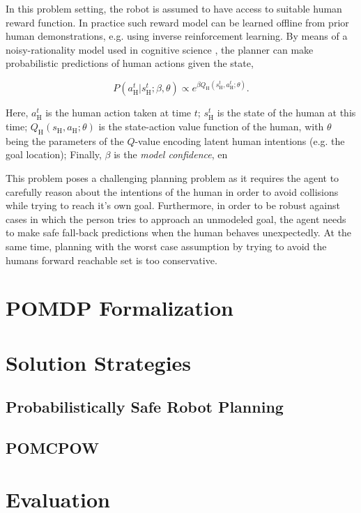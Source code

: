 In this problem setting, the robot is assumed to have access to suitable human
reward function. In practice such reward model can be learned offline from
prior human demonstrations, e.g. using inverse reinforcement
learning. By means of a noisy-rationality model used in cognitive
science \cite{baker2007goal}, the planner can make probabilistic predictions
of human actions given the state,

\begin{equation}
  P\left(a^t_\text{H} | s^t_\text{H}; \beta, \theta \right) \propto e^{\beta Q_\text{H}\left(s^t_\text{H}, a^t_\text{H}; \theta\right)}.
\end{equation}

Here, $a^t_\text{H}$ is the human action taken at time $t$; $s^t_\text{H}$ is
the state of the human at this time; $Q_\text{H}(s_\text{H}, a_\text{H}; \theta)$ is the
state-action value function of the human, with $\theta$ being the parameters of the
$Q$-value encoding latent human intentions (e.g. the goal location); Finally,
$\beta$ is the \emph{model confidence}, en



This problem poses a challenging planning problem as it requires the agent to
carefully reason about the intentions of the human in order to avoid collisions
while trying to reach it's own goal. Furthermore, in order to be robust against
cases in which the person tries to approach an unmodeled goal, the agent needs
to make safe fall-back predictions when the human behaves unexpectedly. At the
same time, planning with the worst case assumption by trying to avoid the
humans forward reachable set is too conservative.

\section{POMDP Formalization}\label{sec:hri-pomdp-formalization}
\section{Solution Strategies}\label{sec:hri-solutions}
\subsection{Probabilistically Safe Robot Planning}\label{sec:hri-baseline}
\subsection{POMCPOW}\label{sec:hri-planners}
\section{Evaluation}\label{sec:hri-evaluation}
